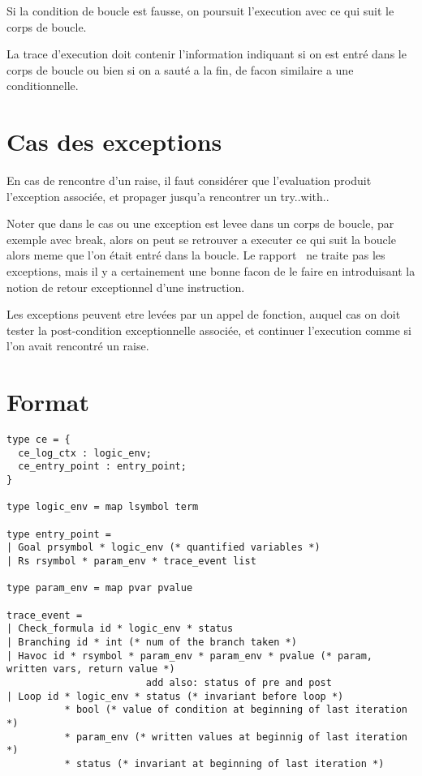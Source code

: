 \documentclass[a4paper,twoside]{article}
\begin{document}
Si la condition de boucle est fausse, on poursuit l'execution avec ce qui suit
le corps de boucle.

La trace d'execution doit contenir l'information indiquant si on est entré dans
le corps de boucle ou bien si on a sauté a la fin, de facon similaire a une
conditionnelle.


\section{Cas des exceptions}

En cas de rencontre d'un raise, il faut considérer que l'evaluation produit
l'exception associée, et propager jusqu'a rencontrer un try..with..

Noter que dans le cas ou une exception est levee dans un corps de boucle, par
exemple avec break, alors on peut se retrouver a executer ce qui suit la boucle
alors meme que l'on était entré dans la boucle. Le rapport~\cite{becker21rr} ne
traite pas les exceptions, mais il y a certainement une bonne facon de le faire
en introduisant la notion de retour exceptionnel d'une instruction.

Les exceptions peuvent etre levées par un appel de fonction, auquel cas on doit
tester la post-condition exceptionnelle associée, et continuer l'execution comme
si l'on avait rencontré un raise.

\section{Format}

\begin{lstlisting}
type ce = {
  ce_log_ctx : logic_env;
  ce_entry_point : entry_point;
}

type logic_env = map lsymbol term

type entry_point =
| Goal prsymbol * logic_env (* quantified variables *)
| Rs rsymbol * param_env * trace_event list

type param_env = map pvar pvalue

trace_event =
| Check_formula id * logic_env * status
| Branching id * int (* num of the branch taken *)
| Havoc id * rsymbol * param_env * param_env * pvalue (* param, written vars, return value *)
                        add also: status of pre and post
| Loop id * logic_env * status (* invariant before loop *)
          * bool (* value of condition at beginning of last iteration *)
          * param_env (* written values at beginnig of last iteration *)
          * status (* invariant at beginning of last iteration *)
\end{lstlisting}
\end{document}
